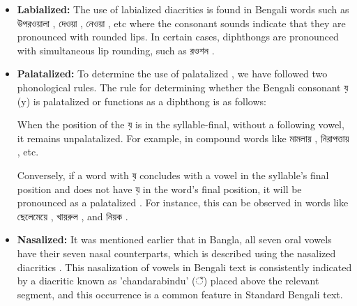 \begin{table}[!ht]
    \centering
    \caption{Phonetic Transcription of proposed Diacritics}
\end{table}

\begin{itemize}
    \item \textbf{Labialized:} The use of labialized diacritics is found in Bengali words such as \textbengali{উপরওয়ালা} , \textbengali{দেওয়া} , \textbengali{নেওয়া} , etc where the consonant sounds indicate that they are pronounced with rounded lips. In certain cases, diphthongs are pronounced with simultaneous lip rounding, such as \textbengali{রওশন} .

    \item \textbf{Palatalized:} To determine the use of palatalized , we have followed two phonological rules. The rule for determining whether the Bengali consonant \textbengali{য়} (y) is palatalized or functions as a diphthong is as follows:

    When the position of the \textbengali{য়} is in the syllable-final, without a following vowel, it remains unpalatalized. For example, in compound words like \textbengali{মামলায়} , \textbengali{নিরাপত্তায়} , etc.

    Conversely, if a word with \textbengali{য়} concludes with a vowel in the syllable's final position and does not have \textbengali{য়} in the word's final position, it will be pronounced as a palatalized . For instance, this can be observed in words like \textbengali{ছেলেমেয়ে} , \textbengali{খায়রুল} , and \textbengali{নিয়ক} .

    \item \textbf{Nasalized:} It was mentioned earlier that in Bangla, all seven oral vowels have their seven nasal counterparts, which is described using the nasalized diacritics . This nasalization of vowels in Bengali text is consistently indicated by a diacritic known as 'chandarabindu' \textbengali{(ঁ)} placed above the relevant segment, and this occurrence is a common feature in Standard Bengali text.
\end{itemize}

